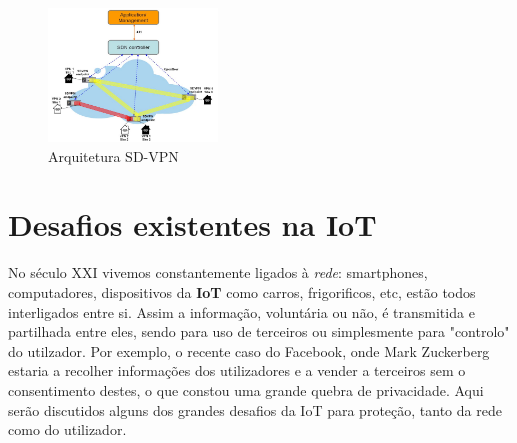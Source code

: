 \documentclass{llncs}
\begin{document}
\begin{figure}
  \centering
    \includegraphics[width=0.4\textwidth]{sdnvpn}
    \caption{Arquitetura SD-VPN \cite{Linda}}
\end{figure}

\section{Desafios existentes na IoT}

No século XXI vivemos constantemente ligados à \textit{rede}: smartphones, computadores, dispositivos da \textbf{IoT} como carros, frigorificos, etc, estão todos interligados entre si. Assim a informação, voluntária ou não, é transmitida e partilhada entre eles, sendo para uso de terceiros ou simplesmente para "controlo" do utilzador.\cite{Fink} Por exemplo, o recente caso do Facebook, onde Mark Zuckerberg estaria a recolher informações dos utilizadores e a vender a terceiros sem o consentimento destes, o que constou uma grande quebra de privacidade.
Aqui serão discutidos alguns dos grandes desafios da IoT para proteção, tanto da rede como do utilizador.
\end{document}
